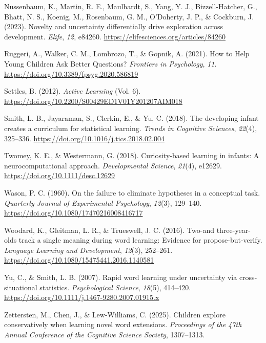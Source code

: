 \documentclass[10pt, letterpaper]{article}
\begin{document}
\begin{CSLReferences}{1}{0}
Nussenbaum, K., Martin, R. E., Maulhardt, S., Yang, Y. J.,
Bizzell-Hatcher, G., Bhatt, N. S., Koenig, M., Rosenbaum, G. M.,
O'Doherty, J. P., \& Cockburn, J. (2023). Novelty and uncertainty
differentially drive exploration across development. \emph{Elife},
\emph{12}, e84260. \url{https://elifesciences.org/articles/84260}

Ruggeri, A., Walker, C. M., Lombrozo, T., \& Gopnik, A. (2021). How to
{Help} {Young} {Children} {Ask} {Better} {Questions}? \emph{Frontiers in
Psychology}, \emph{11}. \url{https://doi.org/10.3389/fpsyg.2020.586819}

Settles, B. (2012). \emph{Active {Learning}} (Vol. 6).
\url{https://doi.org/10.2200/S00429ED1V01Y201207AIM018}

Smith, L. B., Jayaraman, S., Clerkin, E., \& Yu, C. (2018). The
developing infant creates a curriculum for statistical learning.
\emph{Trends in Cognitive Sciences}, \emph{22}(4), 325--336.
\url{https://doi.org/10.1016/j.tics.2018.02.004}

Twomey, K. E., \& Westermann, G. (2018). Curiosity-based learning in
infants: A neurocomputational approach. \emph{Developmental Science},
\emph{21}(4), e12629. \url{https://doi.org/10.1111/desc.12629}

Wason, P. C. (1960). On the failure to eliminate hypotheses in a
conceptual task. \emph{Quarterly Journal of Experimental Psychology},
\emph{12}(3), 129--140. \url{https://doi.org/10.1080/17470216008416717}

Woodard, K., Gleitman, L. R., \& Trueswell, J. C. (2016). Two-and
three-year-olds track a single meaning during word learning: Evidence
for propose-but-verify. \emph{Language Learning and Development},
\emph{12}(3), 252--261.
\url{https://doi.org/10.1080/15475441.2016.1140581}

Yu, C., \& Smith, L. B. (2007). Rapid word learning under uncertainty
via cross-situational statistics. \emph{Psychological Science},
\emph{18}(5), 414--420.
\url{https://doi.org/10.1111/j.1467-9280.2007.01915.x}

Zettersten, M., Chen, J., \& Lew-Williams, C. (2025). Children explore
conservatively when learning novel word extensions. \emph{Proceedings of
the 47th {Annual} {Conference} of the {Cognitive} {Science} {Society}},
1307--1313.


\end{CSLReferences}
\end{document}
